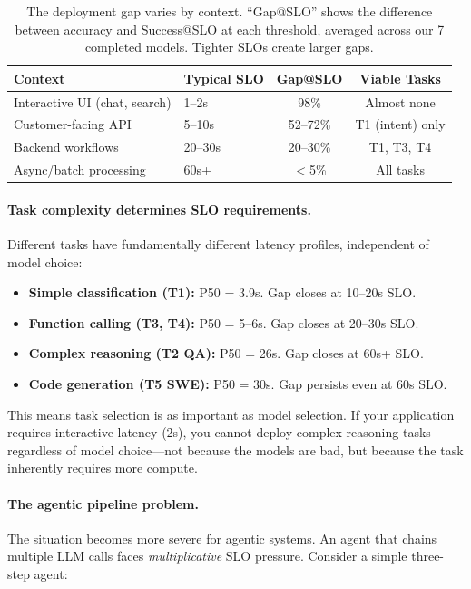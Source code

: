\documentclass[11pt]{article}
\begin{document}
\begin{table}[h]
\centering
\small
\begin{tabular}{llcc}
\toprule
\textbf{Context} & \textbf{Typical SLO} & \textbf{Gap@SLO} & \textbf{Viable Tasks} \\
\midrule
Interactive UI (chat, search) & 1--2s & 98\% & Almost none \\
Customer-facing API & 5--10s & 52--72\% & T1 (intent) only \\
Backend workflows & 20--30s & 20--30\% & T1, T3, T4 \\
Async/batch processing & 60s+ & $<$5\% & All tasks \\
\bottomrule
\end{tabular}
\caption{The deployment gap varies by context. ``Gap@SLO'' shows the difference between accuracy and Success@SLO at each threshold, averaged across our 7 completed models. Tighter SLOs create larger gaps.}
\label{tab:slo-contexts}
\end{table}

\paragraph{Task complexity determines SLO requirements.}
Different tasks have fundamentally different latency profiles, independent of model choice:

\begin{itemize}[leftmargin=12pt]
    \item \textbf{Simple classification (T1):} P50 = 3.9s. Gap closes at 10--20s SLO.
    \item \textbf{Function calling (T3, T4):} P50 = 5--6s. Gap closes at 20--30s SLO.
    \item \textbf{Complex reasoning (T2 QA):} P50 = 26s. Gap closes at 60s+ SLO.
    \item \textbf{Code generation (T5 SWE):} P50 = 30s. Gap persists even at 60s SLO.
\end{itemize}

This means task selection is as important as model selection.
If your application requires interactive latency (2s), you cannot deploy complex reasoning tasks regardless of model choice---not because the models are bad, but because the task inherently requires more compute.

\paragraph{The agentic pipeline problem.}
The situation becomes more severe for agentic systems.
An agent that chains multiple LLM calls faces \emph{multiplicative} SLO pressure.
Consider a simple three-step agent:
\end{document}

